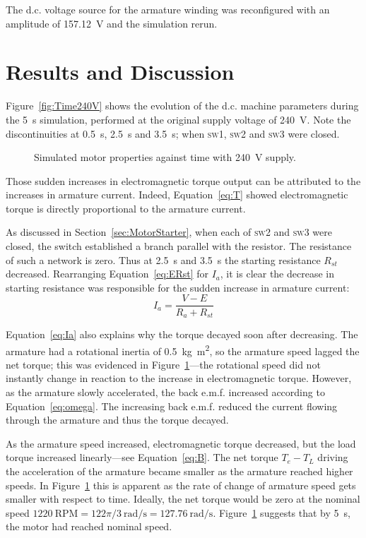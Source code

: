 \documentclass[a4paper,11pt,twocolumn]{article}
\newcommand{\s}{\si{\second}\xspace}
\newcommand{\V}{\si{\volt}\xspace}
\newcommand{\rps}{\si{\radian\per\second}\xspace}
\newcommand{\kgmm}{\si{\kilogram\square\metre}\xspace}
\newcommand{\RPM}{\text{RPM}\xspace}
\newcommand{\DC}{d.c.\xspace}
\newcommand{\EMF}{e.m.f.\xspace}
\newcommand{\SW}[1]{\textsc{sw\footnotesize#1}\xspace}
\begin{document}
The \DC voltage source for the armature winding was reconfigured with an 
amplitude of 157.12~\V and the simulation rerun.

\section{Results and Discussion}

Figure~\vref{fig:Time240V} shows the evolution of the \DC machine parameters 
during the 5~\s simulation, performed at the original supply voltage of 240~\V.
Note the discontinuities at 0.5~\s, 2.5~\s and 3.5~\s; when \SW{1}, \SW{2} and
\SW{3} were closed.
\begin{figure}[t]
    \centering
    \def\svgwidth{0.8\textwidth}
    
    \caption{Simulated motor properties against time with 240~\V supply.}
    \label{fig:Time240V}
\end{figure}

Those sudden increases in electromagnetic torque output can be attributed to 
the increases in armature current. Indeed, Equation~\ref{eq:T} showed 
electromagnetic torque is directly proportional to the armature current.

As discussed in Section~\ref{sec:MotorStarter}, when each of \SW{2} and \SW{3} 
were closed, the switch established a branch parallel with the resistor. The 
resistance of such a network is zero. Thus at 2.5~\s and 3.5~\s the starting 
resistance $R_{st}$ decreased. Rearranging Equation~\ref{eq:ERst} for $I_a$, it 
is clear the decrease in starting resistance was responsible for the sudden 
increase in armature current:
\begin{equation} \label{eq:Ia}
    I_a = \frac{V - E}{R_a + R_{st}}
\end{equation}

Equation~\ref{eq:Ia} also explains why the torque decayed soon after 
decreasing. The armature had a rotational inertia of 0.5~\kgmm, so the armature 
speed lagged the net torque; this was evidenced in 
Figure~\ref{fig:Time240V}---the rotational speed did not instantly change in 
reaction to the increase in electromagnetic torque. However, as the armature 
slowly accelerated, the back \EMF increased according to 
Equation~\ref{eq:omega}. The increasing back \EMF reduced the current flowing 
through the armature and thus the torque decayed.

As the armature speed increased, electromagnetic torque decreased, but the load 
torque increased linearly---see Equation~\ref{eq:B}. The net torque $T_e - T_L$ 
driving the acceleration of the armature became smaller as the armature reached 
higher speeds. In Figure~\ref{fig:Time240V} this is apparent as the rate of 
change of armature speed gets smaller with respect to time. Ideally, the net 
torque would be zero at the nominal speed $1220~\RPM = 122\pi/3~\rps = 
127.76~\rps$. Figure~\ref{fig:Time240V} suggests that by 5~\s, the motor had 
reached nominal speed.
\end{document}

